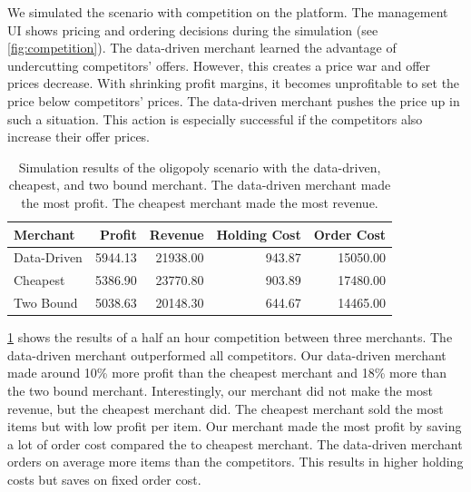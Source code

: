 We simulated the scenario with competition on the \pricewars platform.
The management UI shows pricing and ordering decisions during the simulation (see \cref{fig:competition}).
The data-driven merchant learned the advantage of undercutting competitors' offers.
However, this creates a price war and offer prices decrease.
With shrinking profit margins, it becomes unprofitable to set the price below competitors' prices.
The data-driven merchant pushes the price up in such a situation.
This action is especially successful if the competitors also increase their offer prices.

\begin{table}[t]
	\centering
	\begin{tabular}{lrrrr}
		\toprule
		Merchant & Profit & Revenue & Holding Cost & Order Cost \\
		\midrule
		Data-Driven & 5944.13 & 21938.00 & 943.87 & 15050.00 \\
		Cheapest & 5386.90 & 23770.80 & 903.89 & 17480.00 \\
		Two Bound & 5038.63 & 20148.30 & 644.67 & 14465.00 \\
		\bottomrule
	\end{tabular}
	\caption{Simulation results of the oligopoly scenario with the data-driven, cheapest, and two bound merchant. The data-driven merchant made the most profit. The cheapest merchant made the most revenue.}
	\label{tab:competition}
\end{table}

\cref{tab:competition} shows the results of a half an hour competition between three merchants.
The data-driven merchant outperformed all competitors.
Our data-driven merchant made around 10\% more profit than the cheapest merchant and 18\% more than the two bound merchant.
Interestingly, our merchant did not make the most revenue, but the cheapest merchant did.
The cheapest merchant sold the most items but with low profit per item.
Our merchant made the most profit by saving a lot of order cost compared the to cheapest merchant.
The data-driven merchant orders on average more items than the competitors.
This results in higher holding costs but saves on fixed order cost.



